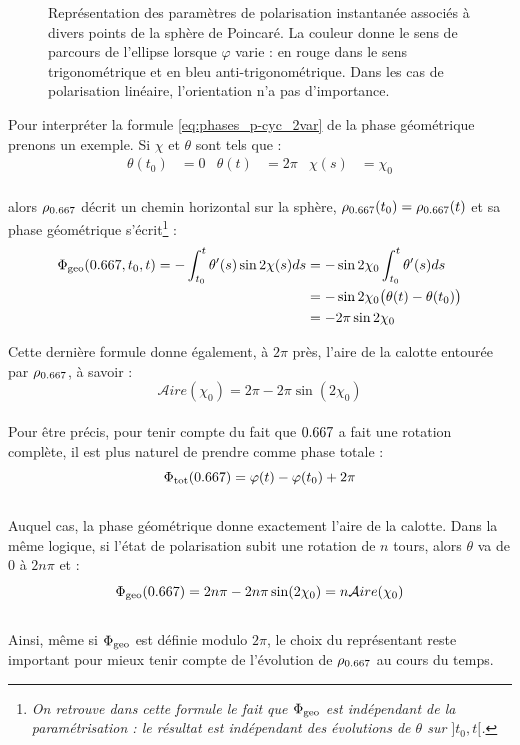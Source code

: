 \begin{figure}[H]
	
	\caption[ États de polarisation associés à divers point de la sphère de Poincaré.]{Représentation des paramètres de polarisation instantanée associés à divers points de la sphère de Poincaré. La couleur donne le sens de parcours de l'ellipse lorsque $\varphi$ varie : en rouge dans le sens trigonométrique et en bleu anti-trigonométrique. Dans les cas de polarisation linéaire, l'orientation n'a pas d'importance.}
	\end{figure}
	
	
	Pour interpréter la formule \eqref{eq:phases_p-cyc_2var} de la phase géométrique prenons un exemple. Si $\chi$ et $\theta$ sont tels que :
	\begin{align*}
\theta(t_0) &= 0  &  \theta(t) &= 2\pi  &  \chi(s) &= \chi_0
\end{align*}
\\
alors $\rho_{\x}$ décrit un chemin horizontal sur la sphère, $\rho_{\x}(t_0) = \rho_{\x}(t)$ et sa phase géométrique s'écrit\footnote{\itshape 
On retrouve dans cette formule le fait que $\Phi_{\text{\normalfont geo}}$ est indépendant de la paramétrisation : le résultat est indépendant des évolutions de $\theta$ sur $]t_0,t[$.} :
\begin{align*}
\phaseg(\x, t_0, t) = -\int_{t_0}^t \theta'(s) \sin 2\chi(s) ds &= - \sin 2\chi_0 \int_{t_0}^t \theta'(s) ds \\
&= - \sin 2\chi_0 \big( \theta(t) - \theta(t_0)\big) \\
&= - 2\pi\sin 2\chi_0
\end{align*}
\skipl

Cette dernière formule donne également, à $2\pi$ près, l’aire de la calotte entourée par $\rho_{\x}$, à savoir :
\[\mathcal{A}ire(\chi_0) = 2\pi - 2\pi \sin(2\chi_0)\]
\\
Pour être précis, pour tenir compte du fait que $\x$ a fait une rotation complète, il est plus naturel de prendre comme phase totale :
\[\phaset(\x) = \varphi(t) - \varphi(t_0) + 2\pi\]
\\
Auquel cas, la phase géométrique donne exactement l'aire de la calotte. Dans la même logique, si l'état de polarisation subit une rotation de $n$ tours, alors $\theta$ va de $0$ à $2n\pi$ et :
\[\phaseg(\x) = 2n\pi - 2n\pi\sin(2\chi_0) = n\mathcal{A}ire(\chi_0)\]
\\
Ainsi, même si $\Phi_{\text{\normalfont geo}}$ est définie modulo $2\pi$, le choix du représentant reste important pour mieux tenir compte de l'évolution de $\rho_{\x}$ au cours du temps.
\\

